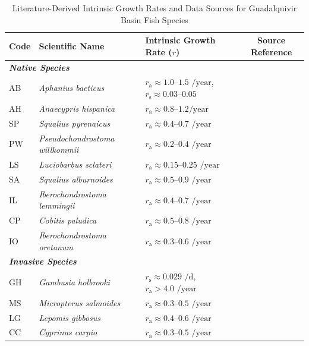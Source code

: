 \documentclass[11pt,a4paper]{article}
\begin{document}
{\begin{table}[h!]
\centering
\caption{Literature-Derived Intrinsic Growth Rates and Data Sources for Guadalquivir Basin Fish Species}
\label{tab:growth_rates}
{\small \begin{tabular}{lllc}
\toprule
\textbf{Code} & \textbf{Scientific Name} & \textbf{Intrinsic Growth Rate ($r$)} & \textbf{Source Reference} \\
\midrule
\multicolumn{4}{l}{\textit{\textbf{Native Species}}} \\
AB & \textit{Aphanius baeticus} & $r_{\text{a}} \approx 1.0$--$1.5\text{ /year}$, $r_{\text{s}} \approx 0.03$--$0.05$ & \cite{FernandezDelgado1988} \\
AH & \textit{Anaecypris hispanica} & $r_{\text{a}} \approx 0.8$--$1.2\text{/year}$ & \cite{SousaSantosetal2016} \\
SP & \textit{Squalius pyrenaicus} & $r_{\text{a}} \approx 0.4$--$0.7\text{ /year}$ & \cite{SousaSantosetal2016} \\
PW & \textit{Pseudochondrostoma willkommii} & $r_{\text{a}} \approx 0.2$--$0.4\text{ /year}$ & \cite{Herrera1992_Barbus} \\
LS & \textit{Luciobarbus sclateri} & $r_{\text{a}} \approx 0.15$--$0.25\text{ /year}$ & \cite{Herrera1992_Barbus} \\
SA & \textit{Squalius alburnoides} & $r_{\text{a}} \approx 0.5$--$0.9\text{ /year}$ &  \cite{SousaSantosetal2016} \\
IL & \textit{Iberochondrostoma lemmingii} & $r_{\text{a}} \approx 0.4$--$0.7\text{ /year}$ &  \cite{SousaSantosetal2016} \\
CP & \textit{Cobitis paludica} & $r_{\text{a}} \approx 0.5$--$0.8\text{ /year}$ & \cite{VilaGispert2005} \\
IO & \textit{Iberochondrostoma oretanum} & $r_{\text{a}} \approx 0.3$--$0.6\text{ /year}$ & \cite{Freyhof2011} \\
\midrule
\multicolumn{4}{l}{\textit{\textbf{Invasive Species}}} \\
GH & \textit{Gambusia holbrooki} & $r_{\text{s}} \approx 0.029\text{ /d}$, $r_{\text{a}} > 4.0\text{ /year}$ & \cite{FernandezDelgado1988} \\
MS & \textit{Micropterus salmoides} & $r_{\text{a}} \approx 0.3$--$0.5\text{ /year}$ & \cite{RuizNavarro2020} \\
LG & \textit{Lepomis gibbosus} & $r_{\text{a}} \approx 0.4$--$0.6\text{ /year}$ & \cite{Lenoir2020} \\
CC & \textit{Cyprinus carpio} & $r_{\text{a}} \approx 0.3$--$0.5\text{ /year}$ & \cite{Herrera2022} \\

\end{tabular}}
\end{table}}
\end{document}
